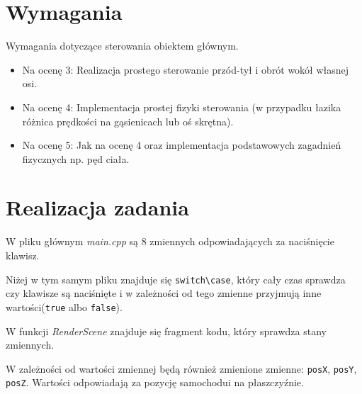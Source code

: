 \documentclass[a4paper, 12pt]{report}
\begin{document}
\section{Wymagania}
Wymagania dotyczące sterowania obiektem głównym.
\begin{itemize}
\item Na ocenę 3: Realizacja prostego sterowanie przód-tył i obrót wokół własnej osi.
\item Na ocenę 4: Implementacja prostej fizyki sterowania (w przypadku łazika różnica prędkości na gąsienicach lub oś skrętna).
\item Na ocenę 5: Jak na ocenę 4 oraz implementacja podstawowych zagadnień fizycznych np. pęd ciała.
\end{itemize}
\section{Realizacja zadania}

W pliku głównym \emph{main.cpp} są 8 zmiennych odpowiadających za naciśnięcie klawisz.



Niżej w tym samym pliku znajduje się \verb|switch\case|, który cały czas sprawdza czy klawisze są naciśnięte i w zależności od tego zmienne przyjmują inne wartości(\verb|true| albo \verb|false|).



W funkcji \emph{RenderScene} znajduje się fragment kodu, który sprawdza stany zmiennych.



W zależności od wartości zmiennej będą również zmienione zmienne: \verb|posX|, \verb|posY|, \verb|posZ|. Wartości odpowiadają za pozycję samochodui na płaszczyźnie. 
\end{document}
